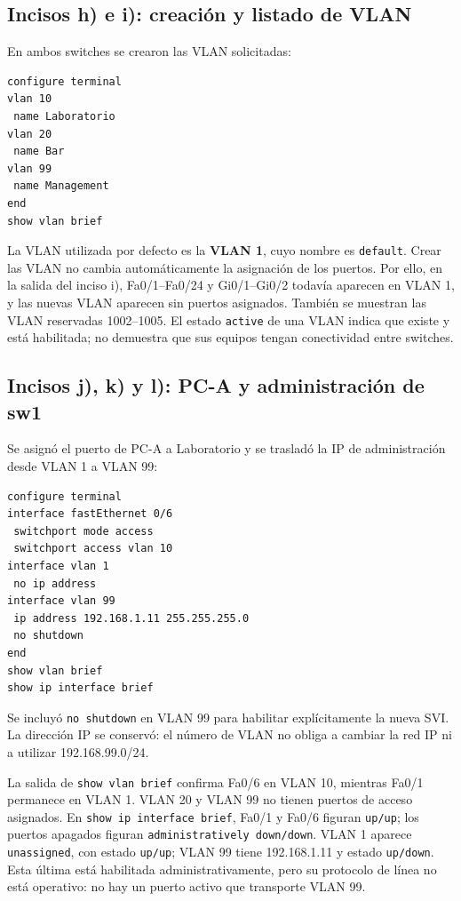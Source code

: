 \documentclass[12pt,a4paper]{article}
\begin{document}
\subsection{Incisos h) e i): creación y listado de VLAN}
En ambos switches se crearon las VLAN solicitadas:
\begin{verbatim}
configure terminal
vlan 10
 name Laboratorio
vlan 20
 name Bar
vlan 99
 name Management
end
show vlan brief
\end{verbatim}
La VLAN utilizada por defecto es la \textbf{VLAN 1}, cuyo nombre es
\texttt{default}. Crear las VLAN no cambia automáticamente la asignación
de los puertos. Por ello, en la salida del inciso i), Fa0/1--Fa0/24 y
Gi0/1--Gi0/2 todavía aparecen en VLAN 1, y las nuevas VLAN aparecen sin
puertos asignados. También se muestran las VLAN reservadas 1002--1005.
El estado \texttt{active} de una VLAN indica que existe y está habilitada;
no demuestra que sus equipos tengan conectividad entre switches.

\subsection{Incisos j), k) y l): PC-A y administración de sw1}
Se asignó el puerto de PC-A a Laboratorio y se trasladó la IP de
administración desde VLAN 1 a VLAN 99:
\begin{verbatim}
configure terminal
interface fastEthernet 0/6
 switchport mode access
 switchport access vlan 10
interface vlan 1
 no ip address
interface vlan 99
 ip address 192.168.1.11 255.255.255.0
 no shutdown
end
show vlan brief
show ip interface brief
\end{verbatim}
Se incluyó \texttt{no shutdown} en VLAN 99 para habilitar explícitamente
la nueva SVI. La dirección IP se conservó: el número de VLAN no obliga
a cambiar la red IP ni a utilizar 192.168.99.0/24.

La salida de \texttt{show vlan brief} confirma Fa0/6 en VLAN 10, mientras
Fa0/1 permanece en VLAN 1. VLAN 20 y VLAN 99 no tienen puertos de acceso
asignados. En \texttt{show ip interface brief}, Fa0/1 y Fa0/6 figuran
\texttt{up/up}; los puertos apagados figuran
\texttt{administratively down/down}. VLAN 1 aparece
\texttt{unassigned}, con estado \texttt{up/up}; VLAN 99 tiene
192.168.1.11 y estado \texttt{up/down}. Esta última está habilitada
administrativamente, pero su protocolo de línea no está operativo:
no hay un puerto activo que transporte VLAN 99.
\end{document}
